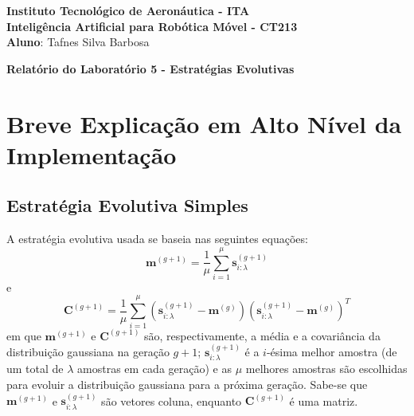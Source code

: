 \documentclass[brazil, 12pt]{article}
\begin{document}
\begin{center}
\textbf{Instituto Tecnológico de Aeronáutica - ITA} \\
\textbf{Inteligência Artificial para Robótica Móvel - CT213} \\
\textbf{Aluno}: Tafnes Silva Barbosa     %
\end{center}

\begin{center}
\textbf{Relatório do Laboratório 5 - Estratégias Evolutivas}
\end{center}
\vspace*{0.5cm}

\section{Breve Explicação em Alto Nível da Implementação}

\subsection{Estratégia Evolutiva Simples}
A estratégia evolutiva usada se baseia nas seguintes equações:
\begin{equation}
	\mathbf{m}^{(g+1)}=\frac{1}{\mu}\sum\limits_{i=1}^{\mu}\mathbf{s}_{i:\lambda}^{(g+1)}
\end{equation}e
\begin{equation}
	\mathbf{C}^{(g+1)}=\frac{1}{\mu}\sum\limits_{i=1}^{\mu}(\mathbf{s}_{i:\lambda}^{(g+1)}-\mathbf{m}^{(g)})(\mathbf{s}_{i:\lambda}^{(g+1)}-\mathbf{m}^{(g)})^{T}
\end{equation}em que $\mathbf{m}^{(g+1)}$ e $\mathbf{C}^{(g+1)}$ são, respectivamente, a média e a covariância da distribuição gaussiana na geração $g+1$; $\mathbf{s}_{i:\lambda}^{(g+1)}$ é a $i$-ésima melhor amostra (de um total de $\lambda$ amostras em cada geração) e as $\mu$ melhores amostras são escolhidas para evoluir a distribuição gaussiana para a próxima geração. Sabe-se que $\mathbf{m}^{(g+1)}$ e $\mathbf{s}_{i:\lambda}^{(g+1)}$ são vetores coluna, enquanto $\mathbf{C}^{(g+1)}$ é uma matriz.
\end{document}
